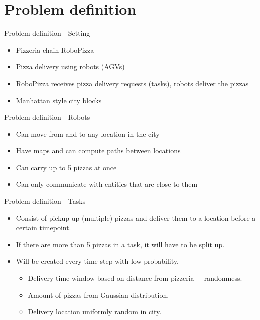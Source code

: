 \section{Problem definition}

\begin{frame}{Problem definition - Setting}
    \begin{itemize}
        \item Pizzeria chain RoboPizza
        \item Pizza delivery using robots (AGVs)
        \item RoboPizza receives pizza delivery requests (tasks), robots deliver the pizzas
        \item Manhattan style city blocks
    \end{itemize}
\end{frame}

\begin{frame}{Problem definition - Robots}
    \begin{itemize}
        \item Can move from and to any location in the city
        \item Have maps and can compute paths between locations
        \item Can carry up to 5 pizzas at once
        \item Can only communicate with entities that are close to them
    \end{itemize}
\end{frame}

\begin{frame}{Problem definition - Tasks}
    \begin{itemize}
        \item Consist of pickup up (multiple) pizzas and deliver them to a location before a certain timepoint.
        \item If there are more than 5 pizzas in a task, it will have to be split up.
        \item Will be created every time step with low probability.
            \begin{itemize}
                \item Delivery time window based on distance from pizzeria + randomness.
                \item Amount of pizzas from Gaussian distribution.
                \item Delivery location uniformly random in city.
            \end{itemize}
    \end{itemize}
\end{frame}

